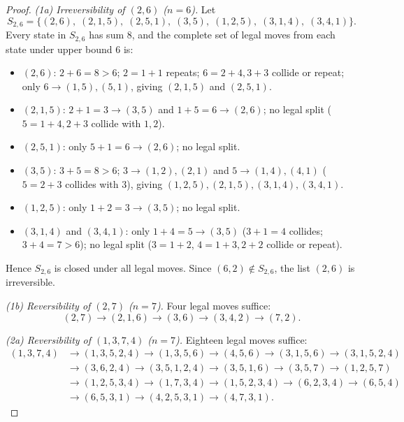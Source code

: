 \documentclass[11pt]{article}
\begin{document}
\begin{proof}
\emph{(1a) Irreversibility of $(2, 6)$ ($n = 6$).} Let
\[
  S_{2, 6} = \bigl\{(2, 6),\; (2, 1, 5),\; (2, 5, 1),\; (3, 5),\; (1, 2, 5),\; (3, 1, 4),\; (3, 4, 1)\bigr\}.
\]
Every state in $S_{2, 6}$ has sum $8$, and the complete set of legal moves from each state under upper bound $6$ is:
\begin{itemize}
  \item $(2, 6)$: $2 + 6 = 8 > 6$; $2 = 1 + 1$ repeats; $6 = 2 + 4, 3 + 3$ collide or repeat; only $6 \to (1, 5), (5, 1)$, giving $(2, 1, 5)$ and $(2, 5, 1)$.
  \item $(2, 1, 5)$: $2 + 1 = 3 \to (3, 5)$ and $1 + 5 = 6 \to (2, 6)$; no legal split ($5 = 1 + 4, 2 + 3$ collide with $1, 2$).
  \item $(2, 5, 1)$: only $5 + 1 = 6 \to (2, 6)$; no legal split.
  \item $(3, 5)$: $3 + 5 = 8 > 6$; $3 \to (1, 2), (2, 1)$ and $5 \to (1, 4), (4, 1)$ ($5 = 2 + 3$ collides with $3$), giving $(1, 2, 5), (2, 1, 5), (3, 1, 4), (3, 4, 1)$.
  \item $(1, 2, 5)$: only $1 + 2 = 3 \to (3, 5)$; no legal split.
  \item $(3, 1, 4)$ and $(3, 4, 1)$: only $1 + 4 = 5 \to (3, 5)$ ($3 + 1 = 4$ collides; $3 + 4 = 7 > 6$); no legal split ($3 = 1 + 2$, $4 = 1 + 3, 2 + 2$ collide or repeat).
\end{itemize}
Hence $S_{2, 6}$ is closed under all legal moves. Since $(6, 2) \notin S_{2, 6}$, the list $(2, 6)$ is irreversible.

\emph{(1b) Reversibility of $(2, 7)$ ($n = 7$).} Four legal moves suffice:
\[
  (2, 7) \to (2, 1, 6) \to (3, 6) \to (3, 4, 2) \to (7, 2).
\]

\emph{(2a) Reversibility of $(1, 3, 7, 4)$ ($n = 7$).} Eighteen legal moves suffice:
\begin{align*}
  (1, 3, 7, 4) &\to (1, 3, 5, 2, 4) \to (1, 3, 5, 6) \to (4, 5, 6) \to (3, 1, 5, 6) \to (3, 1, 5, 2, 4) \\
  &\to (3, 6, 2, 4) \to (3, 5, 1, 2, 4) \to (3, 5, 1, 6) \to (3, 5, 7) \to (1, 2, 5, 7) \\
  &\to (1, 2, 5, 3, 4) \to (1, 7, 3, 4) \to (1, 5, 2, 3, 4) \to (6, 2, 3, 4) \to (6, 5, 4) \\
  &\to (6, 5, 3, 1) \to (4, 2, 5, 3, 1) \to (4, 7, 3, 1).
\end{align*}


\end{proof}
\end{document}
